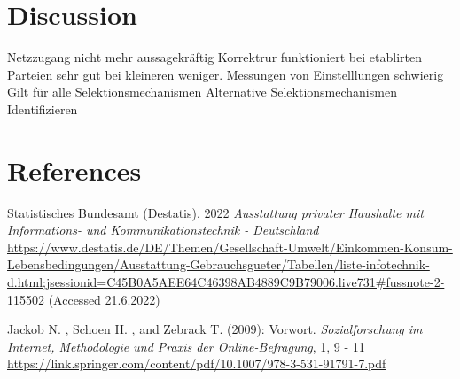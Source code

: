 \documentclass[a4paper , 11pt]{article}
\begin{document}
\section{Discussion}
Netzzugang nicht mehr aussagekräftig
Korrektrur funktioniert bei etablirten Parteien sehr gut bei kleineren weniger.
Messungen von Einstelllungen schwierig
Gilt für alle Selektionsmechanismen 
Alternative Selektionsmechanismen Identifizieren


\newpage


\section*{References}

\begin{description}


\item Statistisches Bundesamt (Destatis), 2022 \textit{Ausstattung privater Haushalte mit Informations- und Kommunikationstechnik - Deutschland} \url{https://www.destatis.de/DE/Themen/Gesellschaft-Umwelt/Einkommen-Konsum-Lebensbedingungen/Ausstattung-Gebrauchsgueter/Tabellen/liste-infotechnik-d.html;jsessionid=C45B0A5AEE64C46398AB4889C9B79006.live731#fussnote-2-115502 } (Accessed 21.6.2022)


\item Jackob N. , Schoen H. , and Zebrack T. (2009): Vorwort. \textit{Sozialforschung
im Internet, Methodologie und Praxis
der Online-Befragung}, 1, 9 - 11  \url{https://link.springer.com/content/pdf/10.1007/978-3-531-91791-7.pdf}

\end{description}
 
\end{document}
